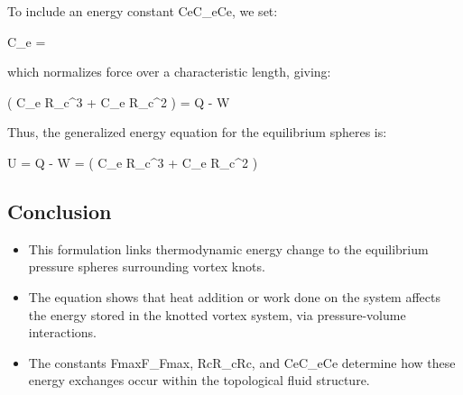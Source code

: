 To include an energy constant CeC_eCe, we set:

C_e = 

which normalizes force over a characteristic length, giving:

\Delta \left(  \pi C_e R_c^3 +  C_e R_c^2 \right) = Q - W

Thus, the generalized energy equation for the equilibrium spheres is:

\Delta U = Q - W = \Delta \left(  \pi C_e R_c^3 +  C_e R_c^2 \right)



\subsection*{Conclusion}
\begin{itemize}
\item This formulation links thermodynamic energy change to the equilibrium pressure spheres surrounding vortex knots.


\item The equation shows that heat addition or work done on the system affects the energy stored in the knotted vortex system, via pressure-volume interactions.


\item The constants Fmax⁡F_{\max}Fmax, RcR_cRc, and CeC_eCe determine how these energy exchanges occur within the topological fluid structure.


\end{itemize}